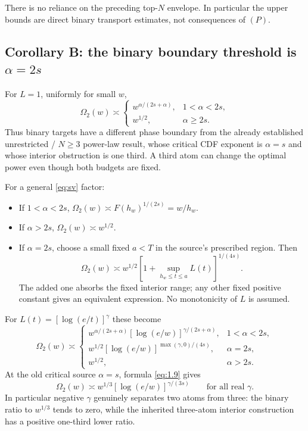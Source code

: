 There is no reliance on the preceding top-$N$ envelope. In particular the upper bounds are direct binary transport estimates, not consequences of $(P)$.

\subsection*{Corollary B: the binary boundary threshold is $\alpha=2s$}

For $L=1$, uniformly for small $w$,
\begin{equation}
  \Omega_2(w)\asymp
  \begin{cases}
    w^{\alpha/(2s+\alpha)},&1<\alpha<2s,\\
    w^{1/2},&\alpha\ge2s.
  \end{cases}
  \tag{1.7}\label{eq:1.7}
\end{equation}
Thus binary targets have a different phase boundary from the already established unrestricted / $N\ge3$ power-law result, whose critical CDF exponent is $\alpha=s$ and whose interior obstruction is one third. A third atom can change the optimal power even though both budgets are fixed.

For a general \eqref{eq:sv} factor:
\begin{itemize}
  \item If $1<\alpha<2s$, $\Omega_2(w)\asymp F(h_w)^{1/(2s)}=w/h_w$.
  \item If $\alpha>2s$, $\Omega_2(w)\asymp w^{1/2}$.
  \item If $\alpha=2s$, choose a small fixed $a<T$ in the source's prescribed region. Then
  \begin{equation}
    \Omega_2(w)\asymp w^{1/2}
      \left[1+\sup_{h_w\le t\le a}L(t)\right]^{1/(4s)}.
    \tag{1.8}\label{eq:1.8}
  \end{equation}
  The added one absorbs the fixed interior range; any other fixed positive constant gives an equivalent expression. No monotonicity of $L$ is assumed.
\end{itemize}
For $L(t)=[\log(e/t)]^\gamma$ these become
\begin{equation}
  \Omega_2(w)\asymp
  \begin{cases}
    w^{\alpha/(2s+\alpha)}[\log(e/w)]^{\gamma/(2s+\alpha)},
      &1<\alpha<2s,\\
    w^{1/2}[\log(e/w)]^{\max(\gamma,0)/(4s)},&\alpha=2s,\\
    w^{1/2},&\alpha>2s.
  \end{cases}
  \tag{1.9}\label{eq:1.9}
\end{equation}
At the old critical source $\alpha=s$, formula \eqref{eq:1.9} gives
\[
  \Omega_2(w)\asymp w^{1/3}[\log(e/w)]^{\gamma/(3s)}
  \qquad\text{for all real }\gamma.
\]
In particular negative $\gamma$ genuinely separates two atoms from three: the binary ratio to $w^{1/3}$ tends to zero, while the inherited three-atom interior construction has a positive one-third lower ratio.


